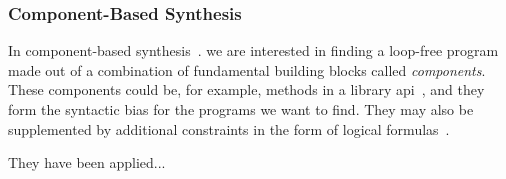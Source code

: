 \subsubsection{Component-Based Synthesis}
\label{sec:components}

In component-based
synthesis~\cite{Shi:2019:FCS,Feng:2018:PSU,Feng:2017:CST,Feng:2017:CSC,Jha:oracle:2010}.
we are interested in finding a loop-free program made out of a combination of
fundamental building blocks called \textit{components}. These components could
be, for example, methods in a library
\gls{api}~\cite{Shi:2019:FCS,Feng:2017:CSC}, and they form the syntactic bias
for the programs we want to find. They may also be supplemented by additional
constraints in the form of logical formulas~\cite{Feng:2018:PSU}.

They have been applied...
